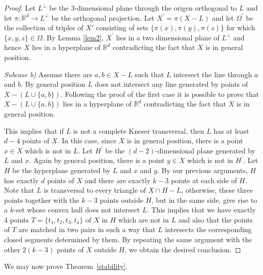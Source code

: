 \documentclass[11pt]{amsart}
\theoremstyle{plain}
\theoremstyle{definition}
\theoremstyle{remark}
\begin{document}
\begin{proof}
Let $L^\perp$ be the 3-dimensional plane through the origen orthogonal to $L$ and let $\pi:\mathbb{R}^{d}\to L^\perp$ be the orthogonal projection.  Let $X^\prime = \pi (X-L)$ and let $\Omega^\prime$ be the collection of triples of $X\prime$ consisting of sets  $\{\pi(x),\pi(y),\pi(z) \}$ for which  $\{x,y,z\}\in \Omega$. By Lemma \ref{lem2}, $X^\prime$ lies in a two dimensional plane of $L^\perp$ and hence  $X$ lies in a hyperplane of  $\mathbb{R}^{d}$ contradicting  the fact that $X$ is in general position.
\medskip

{\em Subcase b)} Assume there are $a,b \in X-L$ such that $L$ intersect the line through $a$ and $b$. By general position  $L$ does not intersect any line generated by points of $X-(L\cup \{a,b \})$. Following the proof of the first case it is possible to prove that $X-(L\cup\{a,b\})$ lies in a hyperplane of  $\mathbb{R}^{d}$ contradicting  the fact that $X$ is in general position. 
\smallskip

This implies that if $L$ is not a complete  Kneser transversal, then $L$ has at least $d-4$ points of $X$. In this case, since $X$ is in general position, there is a point $x\in X$ which is not in $L$.  Let $H^\prime$ be the $(d-2)$-dimensional plane generated by $L$ and $x$. Again by general position, there is a point  $y\in X$ which is not in $H^\prime$. Let $H$ be the hyperplane generated by $L$ and $x$ and $y$. By our previous arguments, $H$ has exactly $d$ points of $X$ and there are exactly $k-3$ points at each side of $H$.   Note that $L$ is transversal to every triangle of  $X\cap H-L$, otherwise, these three points together with the $k-3$ points outside $H$, but in the same side, give rise to a $k$-set whose convex hull does not intersect $L$. This implies that we have exactly 4 points $T=\{t_1,t_2,t_3,t_4\}$ of $X$ in $H$ which are not in $L$ and also that  the points of $T$ are matched  in two pairs in such a way that $L$ intersects the corresponding closed segments determined by them. By repeating the same argument with the other $2(k-3)$ points of $X$ outside $H$, we obtain the desired conclusion.
\end{proof}

We may now prove Theorem~\ref{stability}.
\end{document}
